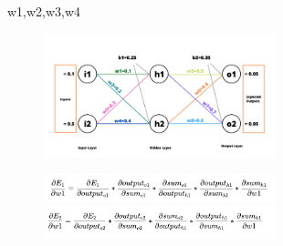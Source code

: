 \documentclass[8pt,dvipsnames]{beamer}
\begin{document}
\begin{frame}{w1,w2,w3,w4}
	\begin{figure}
		\centering
		\includegraphics[width=0.6\textwidth]{imgs/nn_2.png}
	\end{figure}
	\begin{figure}
		\centering
		\includegraphics[width=0.6\textwidth]{imgs/nn_4.png}
		\includegraphics[width=0.6\textwidth]{imgs/nn_5.png}
	\end{figure}
\end{frame}
\end{document}
